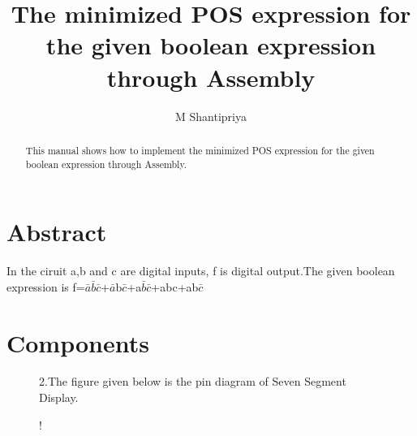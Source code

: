 \documentclass[journal,12pt,twocolumn]{IEEEtran}
\begin{document}
%

\theoremstyle{definition}
\newtheorem{theorem}{Theorem}[section]
\newtheorem{problem}{Problem}
\newtheorem{proposition}{Proposition}[section]
\newtheorem{lemma}{Lemma}[section]
\newtheorem{corollary}[theorem]{Corollary}
\newtheorem{example}{Example}[section]
\newtheorem{definition}{Definition}[section]
\newcommand{\BEQA}{\begin{eqnarray}}
\newcommand{\EEQA}{\end{eqnarray}}
\newcommand{\define}{\stackrel{\triangle}{=}}
\vspace{2cm}
\title{ 
The minimized POS expression for the given boolean expression through Assembly
}

\author{M Shantipriya}


\maketitle
\tableofcontents
%
\section{\textbf{Abstract}}

\begin{abstract}
This manual shows how to implement the minimized POS expression for the given boolean expression through Assembly.
\end{abstract}

In the ciruit a,b and c are digital inputs, f is digital output.The given boolean expression is f=$\bar{a}$$\bar{b}$$\bar{c}$+$\bar{a}$b$\bar{c}$+a$\bar{b}$$\bar{c}$+abc+ab$\bar{c}$

\section{\textbf{Components}}

\begin{table}[!h]
\centering
\caption{}
\label{table:7447_disp}
\end{table}

\begin{figure}[!h]
2.The figure given below is the pin diagram of Seven Segment Display.\\
\begin{center}
\resizebox {0.4\columnwidth} {!} {

}
\end{center}

\caption{}
\label{fig:sevenseg}
\end{figure}
\end{document}
